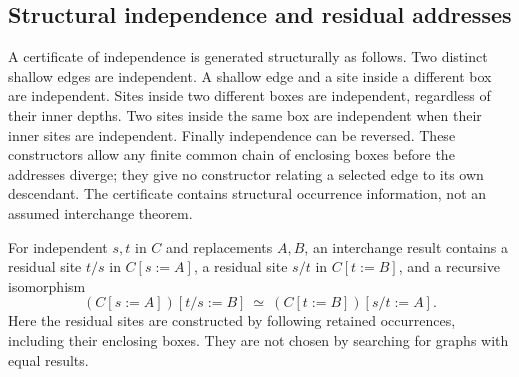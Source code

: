 \subsection{Structural independence and residual addresses}
\begin{definition}\label{term:independent-sites}
A certificate of independence is generated structurally as follows.
Two distinct shallow edges are independent. A shallow edge and a site
inside a different box are independent. Sites inside two different
boxes are independent, regardless of their inner depths. Two sites inside
the same box are independent when their inner sites are independent.
Finally independence can be reversed. These constructors allow any finite
common chain of enclosing boxes before the addresses diverge; they give
no constructor relating a selected edge to its own descendant.
The certificate contains structural occurrence information, not an
assumed interchange theorem.
\end{definition}

\begin{definition}\label{term:interchange-result}
For independent $s,t$ in $C$ and replacements $A,B$, an interchange result
contains a residual site $t/s$ in $C[s:=A]$, a residual site $s/t$ in
$C[t:=B]$, and a recursive isomorphism
\[
        (C[s:=A])[t/s:=B]\ \simeq\
        (C[t:=B])[s/t:=A].
\]
Here the residual sites are constructed by following retained occurrences,
including their enclosing boxes. They are not chosen by searching for
graphs with equal results.
\end{definition}


